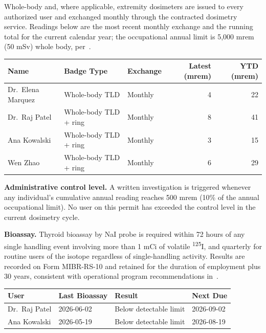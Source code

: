 

Whole-body and, where applicable, extremity dosimeters are issued to every authorized user and
exchanged monthly through the contracted dosimetry service. Readings below are the most recent
monthly exchange and the running total for the current calendar year; the occupational annual
limit is 5,000 mrem (50 mSv) whole body, per~\cite{icrp103}.

\begin{center}
\begin{tabularx}{\linewidth}{@{}l l l r r@{}}
\toprule
\textbf{Name} & \textbf{Badge Type} & \textbf{Exchange} & \textbf{Latest (mrem)} & \textbf{YTD (mrem)} \\
\midrule
Dr.\ Elena Marquez & Whole-body TLD & Monthly & 4 & 22 \\
Dr.\ Raj Patel & Whole-body TLD + ring & Monthly & 8 & 41 \\
Ana Kowalski & Whole-body TLD + ring & Monthly & 3 & 15 \\
Wen Zhao & Whole-body TLD + ring & Monthly & 6 & 29 \\
\bottomrule
\end{tabularx}
\end{center}

\textbf{Administrative control level.} A written investigation is triggered whenever any
individual's cumulative annual reading reaches 500 mrem (10\% of the annual occupational limit).
No user on this permit has exceeded the control level in the current dosimetry cycle.

\vspace{4pt}

\textbf{Bioassay.} Thyroid bioassay by NaI probe is required within 72 hours of any single
handling event involving more than 1 mCi of volatile \textsuperscript{125}I, and quarterly for
routine users of the isotope regardless of single-handling activity. Results are recorded on
Form MIBR-RS-10 and retained for the duration of employment plus 30 years, consistent with
operational program recommendations in~\cite{ncrp127}.

\begin{center}
\begin{tabularx}{\linewidth}{@{}l l l X@{}}
\toprule
\textbf{User} & \textbf{Last Bioassay} & \textbf{Result} & \textbf{Next Due} \\
\midrule
Dr.\ Raj Patel & 2026-06-02 & Below detectable limit & 2026-09-02 \\
Ana Kowalski & 2026-05-19 & Below detectable limit & 2026-08-19 \\
\bottomrule
\end{tabularx}
\end{center}
